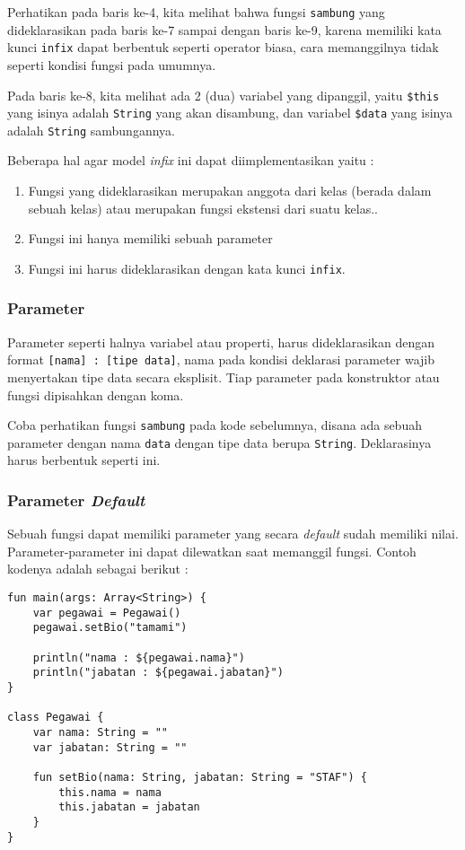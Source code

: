 Perhatikan pada baris ke-4, kita melihat bahwa fungsi \texttt{sambung} yang dideklarasikan pada baris ke-7 sampai dengan baris ke-9, karena memiliki kata kunci \texttt{infix} dapat berbentuk seperti operator biasa, cara memanggilnya tidak seperti kondisi fungsi pada umumnya.

Pada baris ke-8, kita melihat ada 2 (dua) variabel yang dipanggil, yaitu \texttt{\$this} yang isinya adalah \texttt{String} yang akan disambung, dan variabel \texttt{\$data} yang isinya adalah \texttt{String} sambungannya.

Beberapa hal agar model \textit{infix} ini dapat diimplementasikan yaitu :

\begin{enumerate}
	\item Fungsi yang dideklarasikan merupakan anggota dari kelas (berada dalam sebuah kelas) atau merupakan fungsi ekstensi dari suatu kelas..
	\item Fungsi ini hanya memiliki sebuah parameter
	\item Fungsi ini harus dideklarasikan dengan kata kunci \texttt{infix}.
\end{enumerate}

\subsubsection{Parameter}

Parameter seperti halnya variabel atau properti, harus dideklarasikan dengan format \texttt{[nama] : [tipe data]}, nama pada kondisi deklarasi parameter wajib menyertakan tipe data secara eksplisit. Tiap parameter pada konstruktor atau fungsi dipisahkan dengan koma.

Coba perhatikan fungsi \texttt{sambung} pada kode sebelumnya, disana ada sebuah parameter dengan nama \texttt{data} dengan tipe data berupa \texttt{String}. Deklarasinya harus berbentuk seperti ini.

\subsubsection{Parameter \textit{Default}}

Sebuah fungsi dapat memiliki parameter yang secara \textit{default} sudah memiliki nilai. Parameter-parameter ini dapat dilewatkan saat memanggil fungsi. Contoh kodenya adalah sebagai berikut :

\begin{lstlisting}
fun main(args: Array<String>) {
	var pegawai = Pegawai()
	pegawai.setBio("tamami")
	
	println("nama : ${pegawai.nama}")
	println("jabatan : ${pegawai.jabatan}")
}

class Pegawai {
	var nama: String = ""
	var jabatan: String = ""
	
	fun setBio(nama: String, jabatan: String = "STAF") {
		this.nama = nama
		this.jabatan = jabatan
	}
}
\end{lstlisting}

